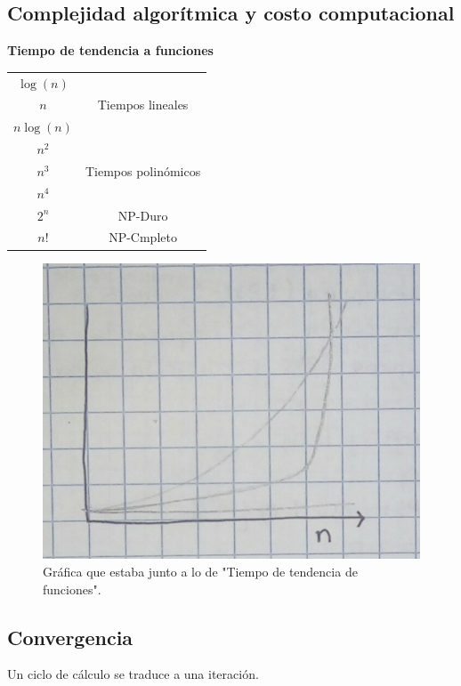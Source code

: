 \subsection{Complejidad algor\'itmica y costo computacional}

\begin{center}
\textbf{Tiempo de tendencia a funciones}\\
\begin{tabular}{| c | c |}
\hline
$\log(n)$ & \\
$n$ & Tiempos lineales \\ 
$n\log(n)$ & \\
\hline
$n^2$ & \\
$n^3$ & Tiempos polin\'omicos \\ 
$n^4$ & \\
\hline
$2^n$ & NP-Duro \\
$n!$ & NP-Cmpleto\\
\hline
\end{tabular}
\end{center}
\begin{figure}[h]
\includegraphics[scale=.16]{grafica-log}
\centering
\caption{Gr\'afica que estaba junto a lo de "Tiempo de tendencia de funciones".}
\end{figure}

\subsection{Convergencia} 
Un ciclo de c\'alculo se traduce a una iteraci\'on. \\

